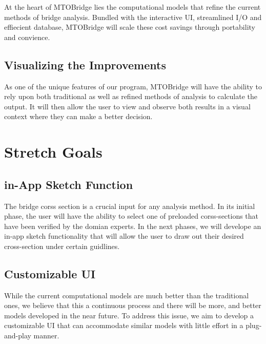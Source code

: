 \documentclass{article}
\begin{document}
At the heart of MTOBridge lies the computational models that refine the current methods of bridge analysis. Bundled with the interactive UI, streamlined I/O and effiecient database, MTOBridge will scale these cost savings through portability and convience. 

\subsection {Visualizing the Improvements}

As one of the unique features of our program, MTOBridge will have the ability to rely upon both traditional as well as refined methods of analysis to calculate the output. It will then allow the user to view and observe both results in a visual context where they can make a better decision.  

\section{Stretch Goals}

\subsection {in-App Sketch Function}

The bridge corss section is a crucial input for any analysis method. In its initial phase, the user will have the ability to select one of preloaded corss-sections that have been verified by the domian experts. In the next phases, we will develope an in-app sketch functionality that will allow the user to draw out their desired cross-section under certain guidlines. 

\subsection {Customizable UI}

While the current computational models are much better than the traditional ones, we believe that this a continuous process and there will be more, and better models developed in the near future. To address this issue, we aim to develop a customizable UI that can accommodate similar models with little effort in a plug-and-play manner. 
\end{document}
